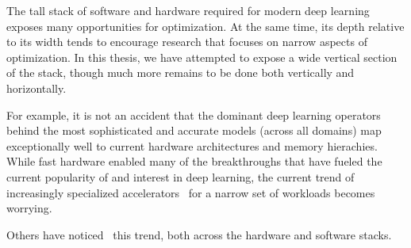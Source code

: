 The tall stack of software and hardware required for modern deep learning exposes many opportunities for optimization.
At the same time, its depth relative to its width tends to encourage research that focuses on narrow aspects of optimization.
In this thesis, we have attempted to expose a wide vertical section of the stack, though much more remains to be done both vertically and horizontally.

For example, it is not an accident that the dominant deep learning operators behind the most sophisticated and accurate models (across all domains) map exceptionally well to current hardware architectures and memory hierachies.
While fast hardware enabled many of the breakthroughs that have fueled the current popularity of and interest in deep learning, the current trend of increasingly specialized accelerators~\cite{chen2014diannao, chen2016diannao, jouppi2017datacenter, abts2020think} for a narrow set of workloads becomes worrying.


Others have noticed~\cite{barham2019machine} this trend, both across the hardware and software stacks.




